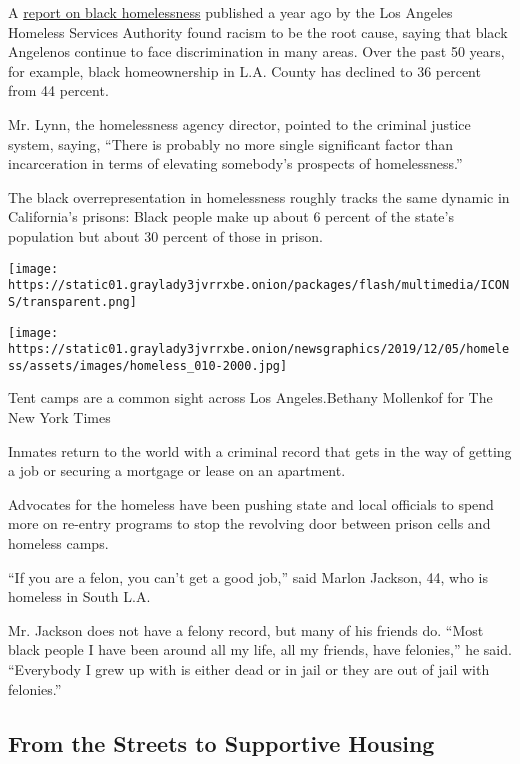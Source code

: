 A
\href{https://www.lahsa.org/documents?id=2823-report-and-recommendations-of-the-ad-hoc-committee-on-black-people-experiencing-homelessness}{report
on black homelessness} published a year ago by the Los Angeles Homeless
Services Authority found racism to be the root cause, saying that black
Angelenos continue to face discrimination in many areas. Over the past
50 years, for example, black homeownership in L.A. County has declined
to 36 percent from 44 percent.

Mr. Lynn, the homelessness agency director, pointed to the criminal
justice system, saying, ``There is probably no more single significant
factor than incarceration in terms of elevating somebody's prospects of
homelessness.''

The black overrepresentation in homelessness roughly tracks the same
dynamic in California's prisons: Black people make up about 6 percent of
the state's population but about 30 percent of those in prison.

\texttt{[image: https://static01.graylady3jvrrxbe.onion/packages/flash/multimedia/ICONS/transparent.png]}

\texttt{[image: https://static01.graylady3jvrrxbe.onion/newsgraphics/2019/12/05/homeless/assets/images/homeless\_010-2000.jpg]}

Tent camps are a common sight across Los Angeles.Bethany Mollenkof for
The New York Times

Inmates return to the world with a criminal record that gets in the way
of getting a job or securing a mortgage or lease on an apartment.

Advocates for the homeless have been pushing state and local officials
to spend more on re-entry programs to stop the revolving door between
prison cells and homeless camps.

``If you are a felon, you can't get a good job,'' said Marlon Jackson,
44, who is homeless in South L.A.

Mr. Jackson does not have a felony record, but many of his friends do.
``Most black people I have been around all my life, all my friends, have
felonies,'' he said. ``Everybody I grew up with is either dead or in
jail or they are out of jail with felonies.''

\hypertarget{from-the-streets-to-supportive-housing}{%
\subsection{From the Streets to Supportive
Housing}\label{from-the-streets-to-supportive-housing}}

